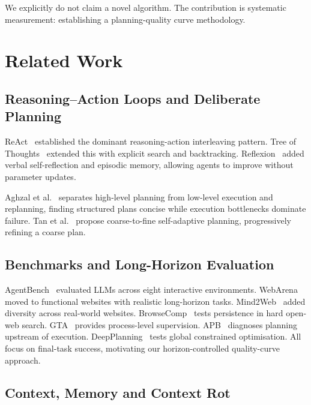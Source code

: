\documentclass[conference]{IEEEtran}
\begin{document}
We explicitly do not claim a novel algorithm. The contribution is systematic
measurement: establishing a planning-quality curve methodology.

\section{Related Work}

\subsection{Reasoning--Action Loops and Deliberate Planning}

ReAct~\cite{yao2023react} established the dominant reasoning-action
interleaving pattern. Tree of Thoughts~\cite{yao2023tot} extended this with
explicit search and backtracking. Reflexion~\cite{shinn2023reflexion} added
verbal self-reflection and episodic memory, allowing agents to improve without
parameter updates.

Aghzal et al.~\cite{aghzal2026hierarchical} separates high-level planning from
low-level execution and replanning, finding structured plans concise while
execution bottlenecks dominate failure. Tan et al.~\cite{tan2026coarse} propose
coarse-to-fine self-adaptive planning, progressively refining a coarse plan.

\subsection{Benchmarks and Long-Horizon Evaluation}

AgentBench~\cite{liu2024agentbench} evaluated LLMs across eight interactive
environments. WebArena~\cite{zhou2024webarena} moved to functional websites
with realistic long-horizon tasks. Mind2Web~\cite{deng2023mind2web} added
diversity across real-world websites. BrowseComp~\cite{wei2025browsecomp}
tests persistence in hard open-web search. GTA~\cite{huang2026gta} provides
process-level supervision. APB~\cite{sun2026apb} diagnoses planning upstream
of execution. DeepPlanning~\cite{zhang2026deepplanning} tests global
constrained optimisation. All focus on final-task success, motivating our
horizon-controlled quality-curve approach.

\subsection{Context, Memory and Context Rot}
\end{document}
